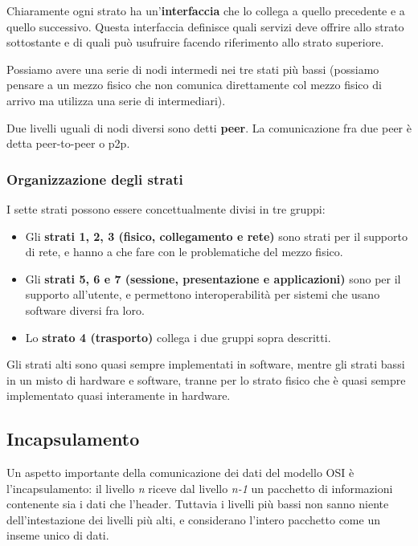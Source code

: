    Chiaramente ogni strato ha un'\textbf{interfaccia} che lo collega a quello precedente e a quello successivo. Questa interfaccia definisce quali servizi deve offrire allo strato sottostante e di quali può usufruire facendo riferimento allo strato superiore.
    
    Possiamo avere una serie di nodi intermedi nei tre stati più bassi (possiamo pensare a un mezzo fisico che non comunica direttamente col mezzo fisico di arrivo ma utilizza una serie di intermediari).
    
    Due livelli uguali di nodi diversi sono detti \textbf{peer}. La comunicazione fra due peer è detta peer-to-peer o p2p.
    
    \subsubsection{Organizzazione degli strati}
        I sette strati possono essere concettualmente divisi in tre gruppi:
        \begin{itemize}
            \item Gli \textbf{strati 1, 2, 3 (fisico, collegamento e rete)} sono strati per il supporto di rete, e hanno a che fare con le problematiche del mezzo fisico.
            
            \item Gli \textbf{strati 5, 6 e 7 (sessione, presentazione e applicazioni)} sono per il supporto all'utente, e permettono interoperabilità per sistemi che usano software diversi fra loro.
            
            \item Lo \textbf{strato 4 (trasporto)} collega i due gruppi sopra descritti.
        \end{itemize}
        
        Gli strati alti sono quasi sempre implementati in software, mentre gli strati bassi in un misto di hardware e software, tranne per lo strato fisico che è quasi sempre implementato quasi interamente in hardware.
    
    \subsection{Incapsulamento}
        Un aspetto importante della comunicazione dei dati del modello OSI è l'incapsulamento: il livello \textit{n} riceve dal livello \textit{n-1} un pacchetto di informazioni contenente sia i dati che l'header. Tuttavia i livelli più bassi non sanno niente dell'intestazione dei livelli più alti, e considerano l'intero pacchetto come un inseme unico di dati.
        
